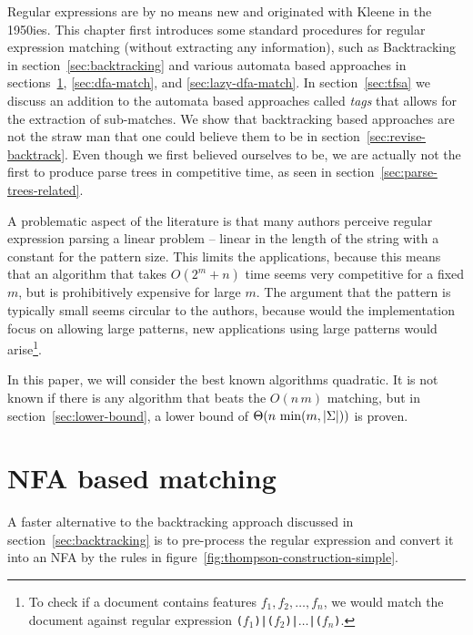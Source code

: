 \documentclass[11pt,a4paper,twoside,openright]{Thesis}
\theoremstyle{definition}
\newcommand{\Figref}[1]{figure~\ref{fig:#1}}
\newcommand{\Secref}[1]{section~\ref{sec:#1}}
\begin{document}
Regular expressions are by no means new and originated with Kleene in the
1950ies\cite{Sips05a}. This chapter first introduces some standard
procedures for regular expression matching (without extracting any
information), such as Backtracking in \Secref{backtracking} and various
automata based approaches in sections~\ref{sec:nfa-match}, \ref{sec:dfa-match},
and \ref{sec:lazy-dfa-match}. In \Secref{tfsa} we discuss an addition to
the automata based approaches called \emph{tags} that allows for the extraction
of sub-matches. We show that backtracking based approaches are not the
straw man that one could believe them to be in \Secref{revise-backtrack}.
Even though we first believed ourselves to be, we are actually not the first
to produce parse trees in competitive time, as seen in \Secref{parse-trees-related}.

A problematic aspect of the literature is that many authors perceive regular 
expression parsing a linear problem -- linear in the length of the string 
with a constant for the pattern size. This limits the applications, because 
this means that an algorithm that takes $O(2^m+n)$ time seems very 
competitive for a fixed $m$, but is prohibitively expensive for large $m$. 
The argument that the pattern is typically small seems circular to the 
authors, because would the implementation focus on allowing large patterns, 
new applications using large patterns would arise\footnote{To check if a document
contains features $f_1, f_2, \dots, f_n$, we would match the document
against regular expression \texttt{($f_1$)|($f_2$)|$\dots$|($f_n$)}.}.

In this paper, we will consider the best known algorithms quadratic. It is 
not known if there is any algorithm that beats the $O(n\, m)$ matching, but 
in \Secref{lower-bound}, a lower bound of $\Theta(n\, \min(m, \left|\Sigma\right|))$ 
is proven.

\section{NFA based matching}\label{sec:nfa-match}
A faster alternative to the backtracking approach discussed in
\Secref{backtracking} is to pre-process the regular expression and convert it
into an NFA by the rules in \Figref{thompson-construction-simple}.
\end{document}
